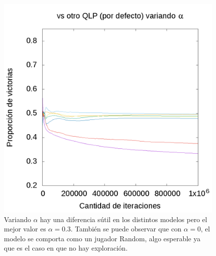 \documentclass[10pt, a4paper]{article}
\begin{document}
\begin{figure}[H]
\begin{minipage}[c]{1\textwidth}
  \includegraphics[trim=235mm 125mm 0mm 150mm, clip, scale=2]{AlphaQ.png}
  \caption{Variando $\alpha$ hay una diferencia sútil en los distintos modelos pero el mejor valor es $\alpha=0.3$. También se puede observar que con $\alpha=0$, el modelo se comporta como un jugador Random, algo esperable ya que es el caso en que no hay exploración.}
  \end{minipage}
\end{figure}
\end{document}
